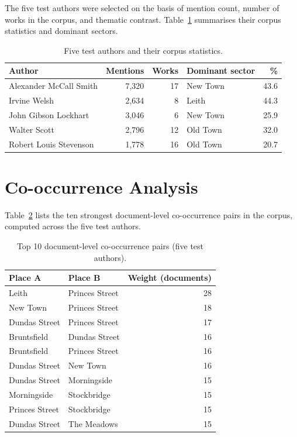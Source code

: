 \documentclass[logo,msc]{infthesis}
\begin{document}
The five test authors were selected on the basis of mention count, number of works in the corpus, and thematic contrast. Table~\ref{tab:authors} summarises their corpus statistics and dominant sectors.
 
\begin{table}[h]
\centering
\caption{Five test authors and their corpus statistics.}
\label{tab:authors}
\small
\begin{tabular}{lrrlr}
\toprule
Author & Mentions & Works & Dominant sector & \% \\
\midrule
Alexander McCall Smith & 7,320 & 17 & New Town & 43.6 \\
Irvine Welsh & 2,634 & 8 & Leith & 44.3 \\
John Gibson Lockhart & 3,046 & 6 & New Town & 25.9 \\
Walter Scott & 2,796 & 12 & Old Town & 32.0 \\
Robert Louis Stevenson & 1,778 & 16 & Old Town & 20.7 \\
\bottomrule
\end{tabular}
\end{table}
 
\section{Co-occurrence Analysis}
 
Table~\ref{tab:cooccurrence} lists the ten strongest document-level co-occurrence pairs in the corpus, computed across the five test authors.
 
\begin{table}[h]
\centering
\caption{Top 10 document-level co-occurrence pairs (five test authors).}
\label{tab:cooccurrence}
\small
\begin{tabular}{llr}
\toprule
Place A & Place B & Weight (documents) \\
\midrule
Leith & Princes Street & 28 \\
New Town & Princes Street & 18 \\
Dundas Street & Princes Street & 17 \\
Bruntsfield & Dundas Street & 16 \\
Bruntsfield & Princes Street & 16 \\
Dundas Street & New Town & 16 \\
Dundas Street & Morningside & 15 \\
Morningside & Stockbridge & 15 \\
Princes Street & Stockbridge & 15 \\
Dundas Street & The Meadows & 15 \\
\bottomrule
\end{tabular}
\end{table}
\end{document}
